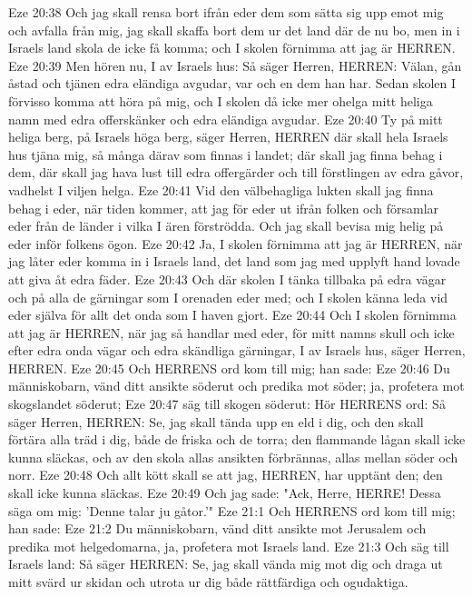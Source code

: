 Eze 20:38  Och jag skall rensa bort ifrån eder dem som sätta sig upp emot mig och avfalla från mig, jag skall skaffa bort dem ur det land där de nu bo, men in i Israels land skola de icke få komma; och I skolen förnimma att jag är HERREN.
Eze 20:39  Men hören nu, I av Israels hus: Så säger Herren, HERREN: Välan, gån åstad och tjänen edra eländiga avgudar, var och en dem han har. Sedan skolen I förvisso komma att höra på mig, och I skolen då icke mer ohelga mitt heliga namn med edra offerskänker och edra eländiga avgudar.
Eze 20:40  Ty på mitt heliga berg, på Israels höga berg, säger Herren, HERREN där skall hela Israels hus tjäna mig, så många därav som finnas i landet; där skall jag finna behag i dem, där skall jag hava lust till edra offergärder och till förstlingen av edra gåvor, vadhelst I viljen helga.
Eze 20:41  Vid den välbehagliga lukten skall jag finna behag i eder, när tiden kommer, att jag för eder ut ifrån folken och församlar eder från de länder i vilka I ären förströdda. Och jag skall bevisa mig helig på eder inför folkens ögon.
Eze 20:42  Ja, I skolen förnimma att jag är HERREN, när jag låter eder komma in i Israels land, det land som jag med upplyft hand lovade att giva åt edra fäder.
Eze 20:43  Och där skolen I tänka tillbaka på edra vägar och på alla de gärningar som I orenaden eder med; och I skolen känna leda vid eder själva för allt det onda som I haven gjort.
Eze 20:44  Och I skolen förnimma att jag är HERREN, när jag så handlar med eder, för mitt namns skull och icke efter edra onda vägar och edra skändliga gärningar, I av Israels hus, säger Herren, HERREN.
Eze 20:45  Och HERRENS ord kom till mig; han sade:
Eze 20:46  Du människobarn, vänd ditt ansikte söderut och predika mot söder; ja, profetera mot skogslandet söderut;
Eze 20:47  säg till skogen söderut: Hör HERRENS ord: Så säger Herren, HERREN: Se, jag skall tända upp en eld i dig, och den skall förtära alla träd i dig, både de friska och de torra; den flammande lågan skall icke kunna släckas, och av den skola allas ansikten förbrännas, allas mellan söder och norr.
Eze 20:48  Och allt kött skall se att jag, HERREN, har upptänt den; den skall icke kunna släckas.
Eze 20:49  Och jag sade: "Ack, Herre, HERRE! Dessa säga om mig: 'Denne talar ju gåtor.'"
Eze 21:1  Och HERRENS ord kom till mig; han sade:
Eze 21:2  Du människobarn, vänd ditt ansikte mot Jerusalem och predika mot helgedomarna, ja, profetera mot Israels land.
Eze 21:3  Och säg till Israels land: Så säger HERREN: Se, jag skall vända mig mot dig och draga ut mitt svärd ur skidan och utrota ur dig både rättfärdiga och ogudaktiga.
